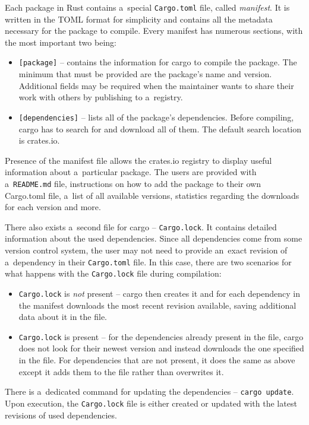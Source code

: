 \documentclass[licencjacka,en]{pracamgr}
\begin{document}
Each package in Rust contains a~special \texttt{Cargo.toml} file, called \textit{manifest}. It is
written in the TOML format for simplicity and contains all the metadata necessary for the package
to compile. Every manifest has numerous sections, with the most important two being:
\begin{itemize}
	\item \texttt{[package]} -- contains the information for cargo to compile the package.
		The minimum that must be provided are the package's name and version. Additional fields
		may be required when the maintainer wants to share their work with others by publishing
		to a~registry.
	\item \texttt{[dependencies]} -- lists all of the package's dependencies. Before compiling,
		cargo has to search for and download all of them. The default search location is crates.io.
\end{itemize}
Presence of the manifest file allows the crates.io registry to display useful information about
a~particular package. The users are provided with a~\texttt{README.md} file, instructions on how
to add the package to their own Cargo.toml file, a~list of all available versions, statistics
regarding the downloads for each version and more.

There also exists a~second file for cargo -- \texttt{Cargo.lock}. It contains detailed
information about the used dependencies. Since all dependencies come from some version control
system, the user may not need to provide an~exact revision of a~dependency in their
\texttt{Cargo.toml} file. In this case, there are two scenarios for what happens with the
\texttt{Cargo.lock} file during compilation:
\begin{itemize}
	\item \texttt{Cargo.lock} is \textit{not} present -- cargo then creates it and for each
		dependency in the manifest downloads the most recent revision available, saving additional
		data about it in the file.
	\item \texttt{Cargo.lock} is present -- for the dependencies already present in the file, cargo
		does not look for their newest version and instead downloads the one specified in the file.
		For dependencies that are not present, it does the same as above except it adds them to
		the file rather than overwrites it.
\end{itemize}
There is a~dedicated command for updating the dependencies -- \texttt{cargo update}.
Upon execution, the \texttt{Cargo.lock} file is either created or updated with the latest
revisions of used dependencies.
\end{document}
